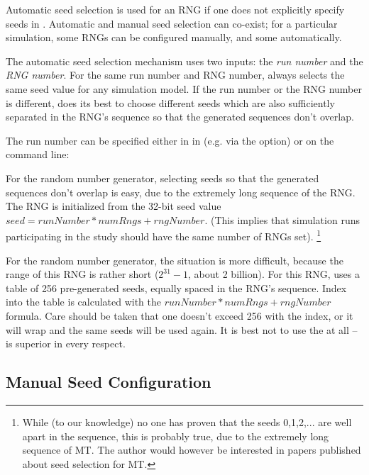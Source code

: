 Automatic seed selection is used for an RNG if one does not explicitly
specify seeds in . Automatic and manual seed selection can
co-exist; for a particular simulation, some RNGs can be configured
manually, and some automatically.

The automatic seed selection mechanism uses two inputs: the \textit{run number}
 and the \textit{RNG number}. For the same run number and RNG number,
{\opp} always selects the same seed value for any simulation model.
If the run number or the RNG number is different, {\opp} does its best
to choose different seeds which are also sufficiently separated in the RNG's sequence
so that the generated sequences don't overlap.

The run number can be specified either in in  (e.g. via the
 option) or on the command line:


For the  random number generator, selecting seeds
so that the generated sequences don't overlap is easy,
due to the extremely long sequence of the RNG.
The RNG is initialized from the 32-bit seed value $seed = runNumber*numRngs + rngNumber$.
(This implies that simulation runs participating in the study should have
the same number of RNGs set).
    \footnote{While (to our knowledge) no one has proven that the seeds 0,1,2,...
    are well apart in the sequence, this is probably true, due to the extremely
    long sequence of MT. The author would however be interested in papers
    published about seed selection for MT.}

For the  random number generator, the situation is more difficult,
because the range of this RNG is rather short ($2^{31}-1$, about 2 billion).
For this RNG, {\opp} uses a table of 256 pre-generated seeds, equally spaced
in the RNG's sequence. Index into the table is calculated with the
$runNumber*numRngs + rngNumber$ formula. Care should be taken that
one doesn't exceed 256 with the index, or it will wrap and the
same seeds will be used again. It is best not to use the 
at all --  is superior in every respect.


\subsection{Manual Seed Configuration}
\label{sec:config-sim:manual-seed-configuration}

